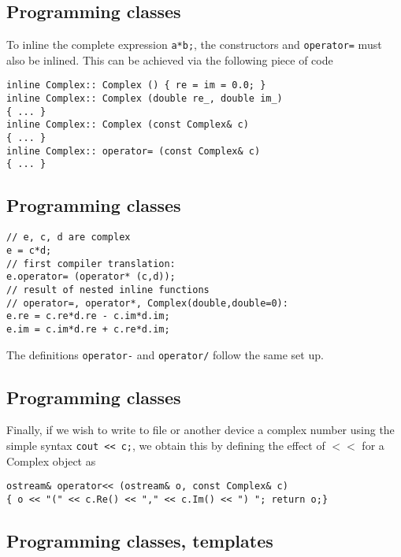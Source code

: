 \documentclass[%
oneside,                 %
final,                   %
10pt]{article}
\begin{document}
\subsection*{Programming classes}

To inline the complete expression \Verb!a*b;!, the constructors and
\Verb!operator=!  must also be inlined.  This can be achieved via the following piece of code

\begin{verbatim}
inline Complex:: Complex () { re = im = 0.0; }
inline Complex:: Complex (double re_, double im_)
{ ... }
inline Complex:: Complex (const Complex& c)
{ ... }
inline Complex:: operator= (const Complex& c)
{ ... }
\end{verbatim}

\subsection*{Programming classes}

\begin{verbatim}
// e, c, d are complex
e = c*d;
// first compiler translation:
e.operator= (operator* (c,d));
// result of nested inline functions
// operator=, operator*, Complex(double,double=0):
e.re = c.re*d.re - c.im*d.im;
e.im = c.im*d.re + c.re*d.im;
\end{verbatim}
The definitions \Verb!operator-! and \Verb!operator/! follow the same set up.

\subsection*{Programming classes}

Finally, if we wish to write to file or another device a complex number using the simple syntax
\Verb!cout << c;!, we obtain this by defining
the effect of $<<$ for a Complex object as

\begin{verbatim}
ostream& operator<< (ostream& o, const Complex& c)
{ o << "(" << c.Re() << "," << c.Im() << ") "; return o;}
\end{verbatim}

\subsection*{Programming classes, templates}
\end{document}
